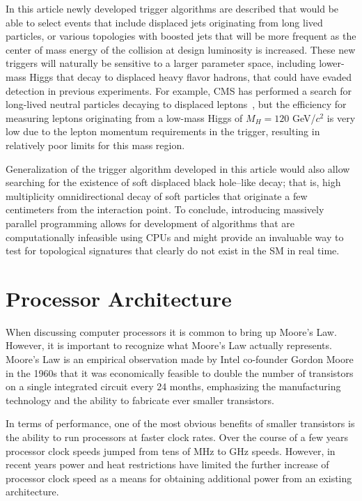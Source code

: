 \documentclass[preprint,sort&compress]{elsarticle}
\begin{document}
In this article newly developed trigger algorithms are described that would be able to select events
that include displaced jets originating from long lived particles, or various topologies with boosted jets that will
be more frequent as the center of mass energy of the collision at design luminosity is increased. These new
triggers will naturally be sensitive to a larger parameter space, including lower-mass Higgs that decay to
displaced heavy flavor hadrons, that could have evaded detection in previous experiments. For example, CMS has 
performed a search for long-lived neutral particles decaying to displaced leptons~\cite{Chatrchyan:2012jna}, 
but the efficiency for measuring leptons originating from a low-mass Higgs of $M_H = 120$ GeV/$c^2$ is very low 
due to the lepton momentum requirements in the trigger, resulting in relatively poor limits for this mass region.

Generalization of the trigger algorithm developed in this article would also allow searching for 
the existence of soft displaced black hole--like decay; that is, high multiplicity omnidirectional decay of soft particles  
that originate a few centimeters from the interaction point. To conclude, introducing massively parallel programming
allows for development of algorithms that are computationally infeasible using CPUs and
might provide an invaluable way to test for topological signatures that clearly do not exist in the SM in real time.



\section{Processor Architecture}

When discussing computer processors it is common to bring up Moore's Law.  However, it is important to recognize what Moore's Law actually represents.  Moore's Law is an empirical observation made by Intel co-founder Gordon Moore in the 1960s that it was economically feasible to double the number of transistors on a single integrated circuit every 24 months,
emphasizing the manufacturing technology and the ability to fabricate ever smaller transistors.


In terms of performance, one of the most obvious benefits of smaller transistors is the ability to run processors at faster clock rates.  Over the course of a few years processor clock speeds jumped from tens of MHz to GHz speeds.  However, in recent years power and heat restrictions have limited the further increase of processor clock speed as a means for obtaining additional power from an existing architecture.
\end{document}
